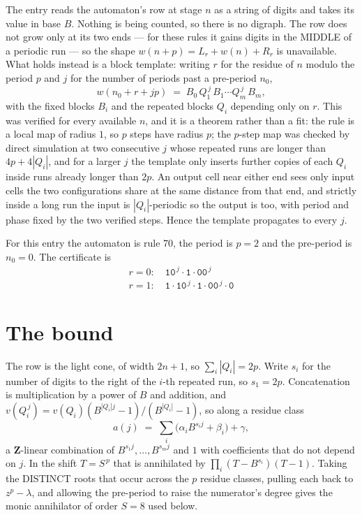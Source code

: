 \documentclass[11pt,a4paper]{article}
\theoremstyle{plain}
\theoremstyle{definition}
\begin{document}
The entry reads the automaton's row at stage $n$ as a string of digits and takes its value in
base $B$. Nothing is being counted, so there is no digraph. The row does not grow only at its
two ends --- for these rules it gains digits in the MIDDLE of a periodic run --- so the shape
$w(n+p)=L_r+w(n)+R_r$ is unavailable. What holds instead is a block template: writing $r$ for
the residue of $n$ modulo the period $p$ and $j$ for the number of periods past a pre-period
$n_0$,
\[
w(n_0 + r + jp)\;=\;B_0\,Q_1^{\,j}\,B_1\cdots Q_m^{\,j}\,B_m,
\]
with the fixed blocks $B_i$ and the repeated blocks $Q_i$ depending only on $r$. This was
verified for every available $n$, and it is a theorem rather than a fit: the rule is a local
map of radius $1$, so $p$ steps have radius $p$; the $p$-step map was checked by direct
simulation at two consecutive $j$ whose repeated runs are longer than $4p+4|Q_i|$, and for a
larger $j$ the template only inserts further copies of each $Q_i$ inside runs already longer
than $2p$. An output cell near either end sees only input cells the two configurations share
at the same distance from that end, and strictly inside a long run the input is
$|Q_i|$-periodic so the output is too, with period and phase fixed by the two verified steps.
Hence the template propagates to every $j$.

For this entry the automaton is rule 70, the period is $p=2$ and the pre-period is $n_0=0$.
The certificate is
\begin{gather*}
r=0:\quad \texttt{10}^{\,j} \cdot \texttt{1} \cdot \texttt{00}^{\,j} \\
r=1:\quad \texttt{1} \cdot \texttt{10}^{\,j} \cdot \texttt{1} \cdot \texttt{00}^{\,j} \cdot \texttt{0}
\end{gather*}

\section{The bound}

The row is the light cone, of width $2n+1$, so $\sum_i|Q_i|=2p$. Write $s_i$ for the number of
digits to the right of the $i$-th repeated run, so $s_1=2p$. Concatenation is multiplication by
a power of $B$ and addition, and $v(Q_i^{\,j})=v(Q_i)(B^{|Q_i|j}-1)/(B^{|Q_i|}-1)$, so along a
residue class
\[
a(j)\;=\;\sum_i \big(\alpha_i B^{s_i j} + \beta_i\big) + \gamma,
\]
a $\mathbf{Z}$-linear combination of $B^{s_1 j},\dots,B^{s_m j}$ and $1$ with coefficients that
do not depend on $j$. In the shift $T=S^{\,p}$ that is annihilated by
$\prod_i(T-B^{s_i})(T-1)$. Taking the DISTINCT roots that occur across the $p$ residue classes,
pulling each back to $z^p-\lambda$, and allowing the pre-period to raise the numerator's degree
gives the monic annihilator of order $S=8$ used below.
\end{document}

